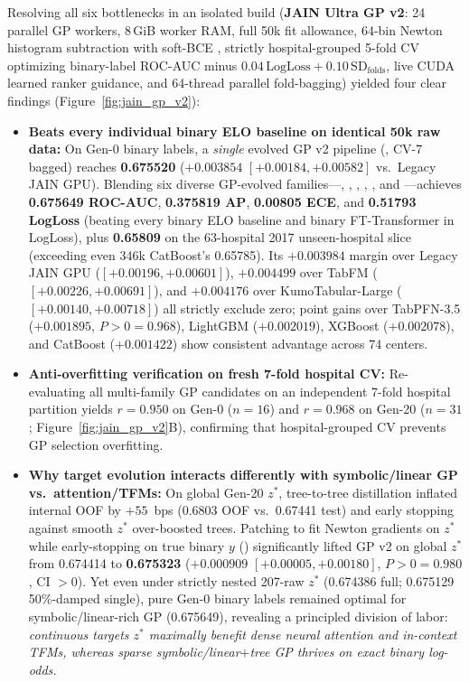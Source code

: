 Resolving all six bottlenecks in an isolated build (\textbf{JAIN Ultra GP v2}: 24 parallel GP workers, 8\,GiB worker RAM, full 50k fit allowance, 64-bin Newton histogram subtraction with soft-BCE , strictly hospital-grouped 5-fold CV optimizing binary-label ROC-AUC minus $0.04\,\mathrm{LogLoss} + 0.10\,\mathrm{SD}_{\mathrm{folds}}$, live CUDA  learned ranker guidance, and 64-thread parallel fold-bagging) yielded four clear findings (Figure~\ref{fig:jain_gp_v2}):
\begin{itemize}
  \item \textbf{Beats every individual binary ELO baseline on identical 50k raw data:} On Gen-0 binary labels, a \emph{single} evolved GP v2 pipeline (, CV-7 bagged) reaches \textbf{0.675520} ($+0.003854$ $[+0.00184, +0.00582]$ vs.\ Legacy JAIN GPU). Blending six diverse GP-evolved families---, , , , , and ---achieves \textbf{0.675649 ROC-AUC}, \textbf{0.375819 AP}, \textbf{0.00805 ECE}, and \textbf{0.51793 LogLoss} (beating every binary ELO baseline and binary FT-Transformer in LogLoss), plus \textbf{0.65809} on the 63-hospital 2017 unseen-hospital slice (exceeding even 346k CatBoost's 0.65785). Its $+0.003984$ margin over Legacy JAIN GPU ($[+0.00196, +0.00601]$), $+0.004499$ over TabFM ($[+0.00226, +0.00691]$), and $+0.004176$ over KumoTabular-Large ($[+0.00140, +0.00718]$) all strictly exclude zero; point gains over TabPFN-3.5 ($+0.001895$, $P>0=0.968$), LightGBM ($+0.002019$), XGBoost ($+0.002078$), and CatBoost ($+0.001422$) show consistent advantage across 74 centers.
  \item \textbf{Anti-overfitting verification on fresh 7-fold hospital CV:} Re-evaluating all multi-family GP candidates on an independent 7-fold hospital partition yields $r = 0.950$ on Gen-0 ($n=16$) and $r = 0.968$ on Gen-20 ($n=31$; Figure~\ref{fig:jain_gp_v2}B), confirming that hospital-grouped CV prevents GP selection overfitting.
  \item \textbf{Why target evolution interacts differently with symbolic/linear GP vs.\ attention/TFMs:} On global Gen-20 $z^*$, tree-to-tree distillation inflated  internal OOF by $+55$~bps (0.6803 OOF vs.\ 0.67441 test) and early stopping against smooth $z^*$ over-boosted trees. Patching  to fit Newton gradients on $z^*$ while early-stopping on true binary $y$ () significantly lifted GP v2 on global $z^*$ from 0.674414 to \textbf{0.675323} (\textbf{$+0.000909$} $[+0.00005, +0.00180]$, $P>0=0.980$, CI $>0$). Yet even under strictly nested 207-raw $z^*$ (0.674386 full; 0.675129 50\%-damped single), pure Gen-0 binary labels remained optimal for symbolic/linear-rich GP (0.675649), revealing a principled division of labor: \emph{continuous targets $z^*$ maximally benefit dense neural attention and in-context TFMs, whereas sparse symbolic/linear$+$tree GP thrives on exact binary log-odds.}

\end{itemize}
